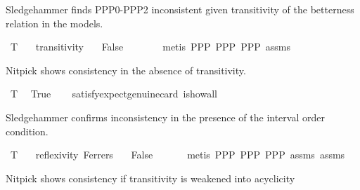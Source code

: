 \begin{isabellebody}
\begin{isamarkuptext}%
Sledgehammer finds PPP0-PPP2 inconsistent given transitivity of the betterness relation in the models.%
\end{isamarkuptext}\isamarkuptrue%
\isamarkupfalse%
\ T{}{\isacharcolon}{\kern0pt}\isanewline
\ \ \ transitivity\isanewline
\ \ \ False\ \isanewline
\ \ %
\isanewline
%
\isadelimproof
\ \ %
\endisadelimproof
%
\isatagproof
{}\isamarkupfalse%
\ {\isacharparenleft}{\kern0pt}metis\ PPP{}\ PPP{}\ PPP{}\ assms{\isacharparenright}{\kern0pt}%
\endisatagproof
{\isafoldproof}%
%
\isadelimproof
%
\endisadelimproof
%
\begin{isamarkuptext}%
Nitpick shows consistency in the absence of transitivity.%
\end{isamarkuptext}\isamarkuptrue%
\isamarkupfalse%
\ T{}{\isacharcolon}{\kern0pt}\isanewline
\ \ True\isanewline
\ \ \isamarkupfalse%
\ {\isacharbrackleft}{\kern0pt}satisfy{\isacharcomma}{\kern0pt}expect{\isacharequal}{\kern0pt}genuine{\isacharcomma}{\kern0pt}card\ i{\isacharequal}{\kern0pt}{}{\isacharcomma}{\kern0pt}show{\isacharunderscore}{\kern0pt}all{\isacharbrackright}{\kern0pt}\ %
\isanewline
%
\isadelimproof
\ \ %
\endisadelimproof
%
\isatagproof
{}\isamarkupfalse%
%
\endisatagproof
{\isafoldproof}%
%
\isadelimproof
%
\endisadelimproof
%
\begin{isamarkuptext}%
Sledgehammer confirms inconsistency in the presence of the interval order condition.%
\end{isamarkuptext}\isamarkuptrue%
\isamarkupfalse%
\ T{}{\isacharcolon}{\kern0pt}\isanewline
\ \ \ reflexivity\ Ferrers\isanewline
\ \ \ False\isanewline
\ \ %
\isanewline
%
\isadelimproof
\ \ %
\endisadelimproof
%
\isatagproof
{}\isamarkupfalse%
\ {\isacharparenleft}{\kern0pt}metis\ PPP{}\ PPP{}\ PPP{}\ assms{\isacharparenleft}{\kern0pt}{}{\isacharparenright}{\kern0pt}\ assms{\isacharparenleft}{\kern0pt}{}{\isacharparenright}{\kern0pt}{\isacharparenright}{\kern0pt}%
\endisatagproof
{\isafoldproof}%
%
\isadelimproof
%
\endisadelimproof
%
\begin{isamarkuptext}%
Nitpick shows consistency if transitivity is weakened into acyclicity

\end{isamarkuptext}
\end{isabellebody}
